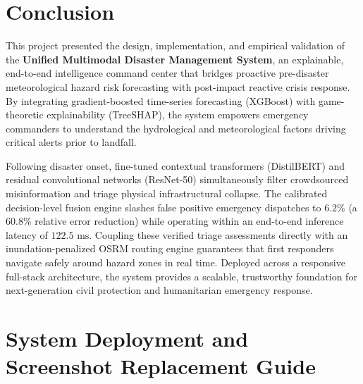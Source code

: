 \documentclass{article}
\begin{document}
\section{Conclusion}
This project presented the design, implementation, and empirical validation of the \textbf{Unified Multimodal Disaster Management System}, an explainable, end-to-end intelligence command center that bridges proactive pre-disaster meteorological hazard risk forecasting with post-impact reactive crisis response. By integrating gradient-boosted time-series forecasting (XGBoost) with game-theoretic explainability (TreeSHAP), the system empowers emergency commanders to understand the hydrological and meteorological factors driving critical alerts prior to landfall. 

Following disaster onset, fine-tuned contextual transformers (DistilBERT) and residual convolutional networks (ResNet-50) simultaneously filter crowdsourced misinformation and triage physical infrastructural collapse. The calibrated decision-level fusion engine slashes false positive emergency dispatches to $6.2\%$ (a $60.8\%$ relative error reduction) while operating within an end-to-end inference latency of $122.5\text{ ms}$. Coupling these verified triage assessments directly with an inundation-penalized OSRM routing engine guarantees that first responders navigate safely around hazard zones in real time. Deployed across a responsive full-stack architecture, the system provides a scalable, trustworthy foundation for next-generation civil protection and humanitarian emergency response.

\appendix
\section{System Deployment and Screenshot Replacement Guide}
\end{document}

